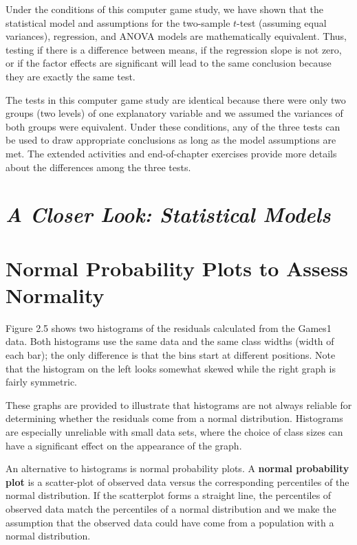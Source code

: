 \documentclass[
]{report}
\begin{document}
Under the conditions of this computer game study, we have shown that the statistical model and assumptions for the two-sample \(t\)-test (assuming equal variances), regression, and ANOVA models are mathematically equivalent. Thus, testing if there is a difference between means, if the regression slope is not zero, or if the factor effects are significant will lead to the same conclusion because they are exactly the same test.

The tests in this computer game study are identical because there were only two groups (two levels) of one explanatory variable and we assumed the variances of both groups were equivalent. Under these conditions, any of the three tests can be used to draw appropriate conclusions as long as the model assumptions are met. The extended activities and end-of-chapter exercises provide more details about the differences among the three tests.

\section*{\texorpdfstring{\emph{A Closer Look: Statistical Models}}{A Closer Look: Statistical Models}}\label{a-closer-look-statistical-models}

\section{\texorpdfstring{\textbf{Normal Probability Plots to Assess Normality}}{Normal Probability Plots to Assess Normality}}\label{normal-probability-plots-to-assess-normality}

Figure 2.5 shows two histograms of the residuals calculated from the Games1 data. Both histograms use the same data and the same class widths (width of each bar); the only difference is that the bins start at different positions. Note that the histogram on the left looks somewhat skewed while the right graph is fairly symmetric.

These graphs are provided to illustrate that histograms are not always reliable for determining whether the residuals come from a normal distribution. Histograms are especially unreliable with small data sets, where the choice of class sizes can have a significant effect on the appearance of the graph.

An alternative to histograms is normal probability plots. A \textbf{normal probability plot} is a scatter-plot of observed data versus the corresponding percentiles of the normal distribution. If the scatterplot forms a straight line, the percentiles of observed data match the percentiles of a normal distribution and we make the assumption that the observed data could have come from a population with a normal distribution.
\end{document}
